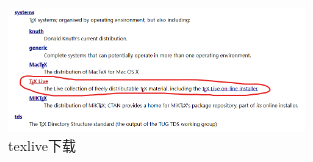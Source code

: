 \begin{figure}[htbp] 
	\centering
	\includegraphics[width=0.7\textwidth]{image/chap01/texlive.png}
	\caption{texlive下载}
	\label{fig:texlive}
\end{figure}
